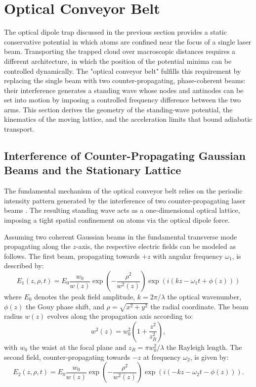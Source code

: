 \section{Optical Conveyor Belt}
\label{sec:conveyor_belt}

The optical dipole trap discussed in the previous section provides a static conservative potential in which atoms are confined near the focus of a single laser beam. Transporting the trapped cloud over macroscopic distances requires a different architecture, in which the position of the potential minima can be controlled dynamically. The "optical conveyor belt" fulfills this requirement by replacing the single beam with two counter-propagating, phase-coherent beams: their interference generates a standing wave whose nodes and antinodes can be set into motion by imposing a controlled frequency difference between the two arms. This section derives the geometry of the standing-wave potential, the kinematics of the moving lattice, and the acceleration limits that bound adiabatic transport.

\subsection{Interference of Counter-Propagating Gaussian Beams and the Stationary Lattice}

The fundamental mechanism of the optical conveyor belt relies on the periodic intensity pattern generated by the interference of two counter-propagating laser beams \cite{Kuhr:03}. The resulting standing wave acts as a one-dimensional optical lattice, imposing a tight spatial confinement on atoms via the optical dipole force.

Assuming two coherent Gaussian beams in the fundamental transverse mode propagating along the $z$-axis, the respective electric fields can be modeled as follows. The first beam, propagating towards $+z$ with angular frequency $\omega_1$, is described by:
\begin{equation}
E_1(z, \rho, t) = E_0 \frac{w_0}{w(z)} \exp\left(-\frac{\rho^2}{w^2(z)}\right) \exp\left(i(k z - \omega_1 t + \phi(z))\right)
\label{eq:beam1}
\end{equation}
where $E_0$ denotes the peak field amplitude, $k = 2\pi/\lambda$ the optical wavenumber, $\phi(z)$ the Gouy phase shift, and $\rho=\sqrt{x^2+y^2}$ the radial coordinate. The beam radius $w(z)$ evolves along the propagation axis according to:
\begin{equation}
w^2(z) = w_0^2 \left(1 + \frac{z^2}{z_R^2}\right),
\label{eq:beam_waist}
\end{equation}
with $w_0$ the waist at the focal plane and $z_R = \pi w_0^2/\lambda$ the Rayleigh length. The second field, counter-propagating towards $-z$ at frequency $\omega_2$, is given by:
\begin{equation}
E_2(z, \rho, t) = E_0 \frac{w_0}{w(z)} \exp\left(-\frac{\rho^2}{w^2(z)}\right) \exp\left(i(-k z - \omega_2 t - \phi(z))\right).
\label{eq:beam2}
\end{equation}


